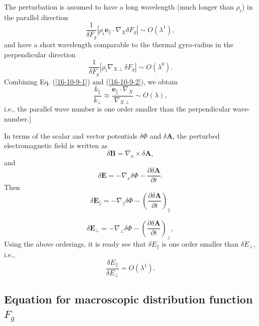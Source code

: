 \documentclass{llncs}
\begin{document}
The perturbation is assumed to have a long wavelength (much longer than
$\rho_i$) in the parallel direction
\begin{equation}
  \label{16-10-9-1} \frac{1}{\delta F_g} | \rho_i \mathbf{e}_{\parallel} \cdot
  \nabla_X \delta F_g | \sim O (\lambda^1),
\end{equation}
and have a short wavelength comparable to the thermal gyro-radius in the
perpendicular direction
\begin{equation}
  \label{16-10-9-2} \frac{1}{\delta F_g} | \rho_i \nabla_{X \perp} \delta F_g
  | \sim O (\lambda^0) .
\end{equation}
Combining Eq. (\ref{16-10-9-1}) and (\ref{16-10-9-2}), we obtain
\begin{equation}
  \frac{k_{\parallel}}{k_{\perp}} \approx \frac{\mathbf{e}_{\parallel} \cdot
  \nabla_X}{\nabla_{X \perp}} \sim O (\lambda),
\end{equation}
i.e., the parallel wave number is one order smaller than the perpendicular
wave-number.]

In terms of the scalar and vector potentials $\delta \Phi$ and $\delta
\mathbf{A}$, the perturbed electromagnetic field is written as
\begin{equation}
  \delta \mathbf{B}= \nabla_x \times \delta \mathbf{A},
\end{equation}
and
\begin{equation}
  \label{18-3-6-a7} \delta \mathbf{E}= - \nabla_x \delta \Phi - \frac{\partial
  \delta \mathbf{A}}{\partial t} .
\end{equation}
Then
\begin{equation}
  \delta \mathbf{E}_{\parallel} = - \nabla_{\parallel} \delta \Phi - \left(
  \frac{\partial \delta \mathbf{A}}{\partial t} \right)_{\parallel}
\end{equation}

\begin{equation}
  \delta \mathbf{E}_{\perp} = - \nabla_{\perp} \delta \Phi - \left(
  \frac{\partial \delta \mathbf{A}}{\partial t} \right)_{\perp},
\end{equation}
Using the above orderings, it is ready see that $\delta E_{\parallel}$ is one
order smaller than $\delta E_{\perp}$, i.e.,
\begin{equation}
  \frac{\delta E_{\parallel}}{\delta E_{\perp}} = O (\lambda^1) .
\end{equation}

\subsection{Equation for macroscopic distribution function $F_g$}
\end{document}
